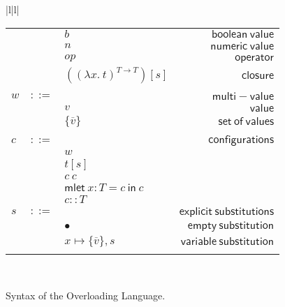 \documentclass[preprint,authoryear,sort&compress,9pt,nocopyrightspace]{article}
\newcommand{\conf}[2][s]{(#2)[#1]}
\newcommand{\subx}{x \mapsto \{\overline{v}\},s}
\newcommand{\subxDT}{x \mapsto \{(\overline{v:T})\},s}
\newcommand{\ascrip}[1]{#1::T}
\newcommand{\negacion}[1]{\mathsf{not} \ #1}
\newcommand{\suma}[1]{\mathsf{add1} \ #1}
\newcommand{\oletPT}[3]{\mathsf{mlet} \ x : #1 = #2 \ \mathsf{in}  \ #3}
\newcommand{\absSTT}[2]{(\lambda #1. \ #2)^{T \to T}}
\newcommand{\semanticD}{Overloading Language}
\begin{document}
\begin{figure}
\begin{small}
\begin{center}
\begin{tabular}{|l|l|}
\begin{tabular}{l c l r}
&&$b$&$\mathsf {boolean \ value}$\\
&&$n$&$\mathsf{numeric \ value} $\\
&&$op$&$\mathsf{operator}$\\
&&$\conf{\absSTT {x}{t}}$&$\mathsf{closure}$\\
&&&\\
$w$&$::=$&&$\mathsf {multi-value}$\\
&&$v$&$\mathsf {value}$\\
&&$\{\overline{v}\}$&$\mathsf {set \ of \ values}$\\
&&&\\
$c$&$::=$&&$\mathsf {configurations}$\\
&&$w$&\\
&&$t[s]$&\\
&&$c \ c $&\\
&&$\oletPT{T}{c}{c}$&\\
&&$\ascrip{c}$&\\
$s$&$::=$&&$\mathsf {explicit \ substitutions}$\\
&&$ \bullet$&$\mathsf {empty \ substitution}$\\
&&$\subx$&$\mathsf {variable \ substitution}$\\
&&&\\
\end{tabular}\\
\hline
\end{tabular}
\hspace*{-2cm}
\caption{Syntax of the \semanticD.}
\label{figure:sencilla}
\end{center}
\end{small}
\end{figure}
\end{document}
